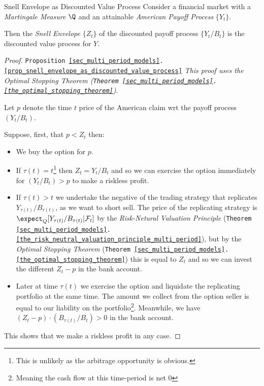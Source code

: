 \documentclass[11pt,a4paper]{article}
\begin{document}
  \begin{proposition}{Snell Envelope as Discounted Value Process}\label{prop_snell_envelope_as_discounted_value_process}
    Consider a financial market with a \textit{Martingale Measure} $\Q$ and an attainable \textit{American Payoff Process} $\{Y_t\}$.
    \par Then the \textit{Snell Envelope} $\{Z_t\}$ of the discounted payoff process $\{Y_t/B_t\}$ is the discounted value process for $Y$.
  \end{proposition}

  \begin{proof}{\texttt{Proposition \ref{sec_multi_period_models}.\ref{prop_snell_envelope_as_discounted_value_process}}}
    \textit{This proof uses the Optimal Stopping Theorem (\texttt{Theorem \ref{sec_multi_period_models}.\ref{the_optimal_stopping_theorem}})}.
    \par Let $p$ denote the time $t$ price of the American claim wrt the payoff process $(Y_t/B_t)$.
    \par Suppose, first, that $p<Z_t$ then:
    \begin{itemize}
      \item We buy the option for $p$.
      \item If $\tau(t)=t$\footnote{This is unlikely as the arbitrage opportunity is obvious.} then $Z_t=Y_t/B_t$ and so we can exercise the option immediately for $(Y_t/B_t)>p$ to make a riskless profit.
      \item If $\tau(t)>t$ we undertake the negative of the trading strategy that replicates $Y_{\tau(t)}/B_{\tau(t)}$, as we want to short sell. The price of the replicating strategy is $\expect_Q[Y_{\tau(t)}/B_{\tau(t)}|\mathcal{F}_t]$ by the \textit{Risk-Netural Valuation Principle} (\texttt{Theorem \ref{sec_multi_period_models}.\ref{the_risk_neutral_valuation_principle_multi_period}}), but by the \textit{Optimal Stopping Theorem} (\texttt{Theorem \ref{sec_multi_period_models}.\ref{the_optimal_stopping_theorem}}) this is equal to $Z_t$ and so we can invest the different $Z_t-p$ in the bank account.
      \item Later at time $\tau(t)$ we exercise the option and liquidate the replicating portfolio at the same time. The amount we collect from the option seller is equal to our liability on the portfolio\footnote{Meaning the cash flow at this time-period is net 0}. Meanwhile, we have $(Z_t-p)\cdot(B_{\tau(t)}/B_t)>0$ in the bank account.
    \end{itemize}
    This shows that we make a riskless profit in any case.


\end{proof}
\end{document}
